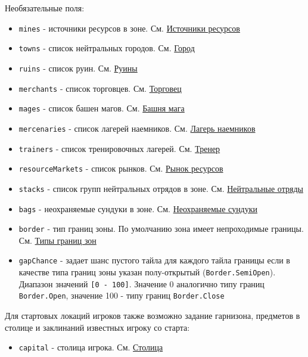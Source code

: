 Необязательные поля:
\begin{itemize}
\item \texttt{mines} - источники ресурсов в зоне. См. \hyperref[crystals]{Источники ресурсов}
\item \texttt{towns} - список нейтральных городов. См. \hyperref[city]{Город}
\item \texttt{ruins} - список руин. См. \hyperref[ruin]{Руины}
\item \texttt{merchants} - список торговцев. См. \hyperref[merchant]{Торговец}
\item \texttt{mages} - список башен магов. См. \hyperref[mage]{Башня мага}
\item \texttt{mercenaries} - список лагерей наемников. См. \hyperref[mercenary]{Лагерь наемников}
\item \texttt{trainers} - список тренировочных лагерей. См. \hyperref[trainer]{Тренер}
\item \texttt{resourceMarkets} - список рынков. См. \hyperref[resourcemarket]{Рынок ресурсов}
\item \texttt{stacks} - список групп нейтральных отрядов в зоне. См. \hyperref[neutralStacks]{Нейтральные отряды}
\item \texttt{bags} - неохраняемые сундуки в зоне. См. \hyperref[bags]{Неохраняемые сундуки}
\item \texttt{border} - тип границ зоны. По умолчанию зона имеет непроходимые границы. См. \hyperref[borderTypes]{Типы границ зон}
\item \texttt{gapChance} - задает шанс пустого тайла для каждого тайла границы если в качестве типа границ зоны указан полу-открытый (\texttt{Border.SemiOpen}). Диапазон значений \texttt{[0 - 100]}. Значение 0 аналогично типу границ \texttt{Border.Open}, значение 100 - типу границ \texttt{Border.Close}
\end{itemize}

Для стартовых локаций игроков также возможно задание гарнизона, предметов в столице и заклинаний известных игроку со старта:
\begin{itemize}
\item \texttt{capital} - столица игрока. См. \hyperref[capital]{Столица}
\end{itemize}

